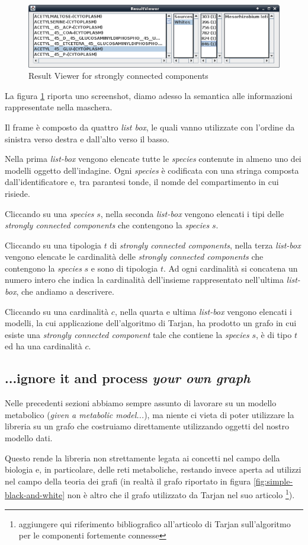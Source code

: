 \begin{figure}
  \centering
  \includegraphics[scale=0.6]{images/ResultViewer-execution.eps}
  \caption{Result Viewer for strongly connected components}
  \label{fig:result-viewer-scc}
\end{figure}
La figura \ref{fig:result-viewer-scc} riporta uno screenshot, diamo
adesso la semantica alle informazioni rappresentate nella maschera. 

Il frame \`e composto da quattro \emph{list box}, le quali vanno
utilizzate con l'ordine da sinistra verso destra e dall'alto verso il
basso.

Nella prima \emph{list-box} vengono elencate tutte le \emph{species}
contenute in almeno uno dei modelli oggetto dell'indagine. Ogni
\emph{species} \`e codificata con una stringa composta
dall'identificatore e, tra parantesi tonde, il nomde del compartimento
in cui risiede.

Cliccando su una \emph{species} $s$, nella seconda \emph{list-box}
vengono elencati i tipi delle \emph{strongly connected components} che
contengono la \emph{species} $s$.

Cliccando su una tipologia $t$ di \emph{strongly connected
  components}, nella terza \emph{list-box} vengono elencate le
cardinalit\`a delle \emph{strongly connected components} che
contengono la \emph{species} $s$ e sono di tipologia $t$. Ad ogni
cardinalit\`a si concatena un numero intero che indica la
cardinalit\`a dell'insieme rappresentato nell'ultima \emph{list-box},
che andiamo a descrivere.

Cliccando su una cardinalit\`a $c$, nella quarta e ultima
\emph{list-box} vengono elencati i modelli, la cui applicazione
dell'algoritmo di Tarjan, ha prodotto un grafo in cui esiste una
\emph{strongly connected component} tale che contiene la
\emph{species} $s$, \`e di tipo $t$ ed ha una cardinalit\`a $c$.

\subsection{...ignore it and process \emph{your own graph}}
Nelle precedenti sezioni abbiamo sempre assunto di lavorare su un
modello metabolico (\emph{given a metabolic model...}), ma niente ci
vieta di poter utilizzare la libreria su un grafo che costruiamo
direttamente utilizzando oggetti del nostro modello dati.

Questo rende la libreria non strettamente legata ai concetti nel campo
della biologia e, in particolare, delle reti metaboliche, restando
invece aperta ad utilizzi nel campo della teoria dei grafi (in
realt\`a il grafo riportato in figura \ref{fig:simple-black-and-white}
non \`e altro che il grafo utilizzato da Tarjan nel suo articolo
\footnote{aggiungere qui riferimento bibliografico all'articolo di
  Tarjan sull'algoritmo per le componenti fortemente connesse}).



